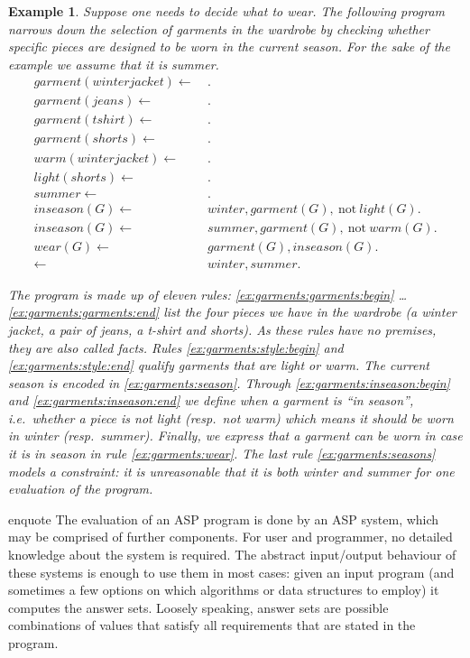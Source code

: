 \documentclass{vutinfth} %
\newtheorem{example}{Example}[chapter]
\newcommand{\fail}{\mathrm{not } \ \xspace}
\newcommand{\from}{\ensuremath{\leftarrow}}
\begin{document}
\begin{example}
\label{ex:garments}
Suppose one needs to decide what to wear. The following program narrows down the selection of garments in the wardrobe by checking whether specific pieces are designed to be worn in the current season. For the sake of the example we assume that it is summer.
\begin{align}
garment(winterjacket)\from& \ .\tag{$f_1$}\label{ex:garments:garments:begin}\\
garment(jeans)\from& \ .\tag{$f_2$}\\
garment(tshirt)\from& \ .\tag{$f_3$}\\
garment(shorts)\from& \ .\tag{$f_4$}\label{ex:garments:garments:end}\\
warm(winterjacket)\from& \ .\tag{$f_5$}\label{ex:garments:style:begin}\\
light(shorts)\from& \ .\tag{$f_6$}\label{ex:garments:style:end}\\
summer\from& \ .\tag{$f_7$}\label{ex:garments:season}\\
inseason(G) \from& \ winter, garment(G),~\fail light(G). \tag{$r_1$}\label{ex:garments:inseason:begin}\\
inseason(G) \from& \ summer, garment(G),~\fail warm(G). \tag{$r_2$}\label{ex:garments:inseason:end}\\
wear(G) \from& \ garment(G), inseason(G). \tag{$r_3$}\label{ex:garments:wear}\\
\from& \ winter, summer. \tag{$c_1$}\label{ex:garments:seasons}
\end{align}

The program is made up of eleven rules: \ref{ex:garments:garments:begin} \ldots \ref{ex:garments:garments:end} list the four pieces we have in the wardrobe (a winter jacket, a pair of jeans, a t-shirt and shorts). As these rules have no premises, they are also called \emph{facts}. Rules \ref{ex:garments:style:begin} and \ref{ex:garments:style:end} qualify garments that are light or warm. The current season is encoded in \ref{ex:garments:season}. Through \ref{ex:garments:inseason:begin} and \ref{ex:garments:inseason:end} we define when a garment is \enquote{in season}, i.e.~whether a piece is not light (resp.~not warm) which means it should be worn in winter (resp.~summer). Finally, we express that a garment can be worn in case it is in season in rule \ref{ex:garments:wear}. The last rule \ref{ex:garments:seasons} models a \emph{constraint}: it is unreasonable that it is both winter and summer for one evaluation of the program.
\end{example}
enquote
The evaluation of an ASP program is done by an ASP system, which may be comprised of further components. For user and programmer, no detailed knowledge about the system is required. The abstract input/output behaviour of these systems is enough to use them in most cases: given an input program (and sometimes a few options on which algorithms or data structures to employ) it computes the answer sets. Loosely speaking, answer sets are possible combinations of values that satisfy all requirements that are stated in the program.
\end{document}
